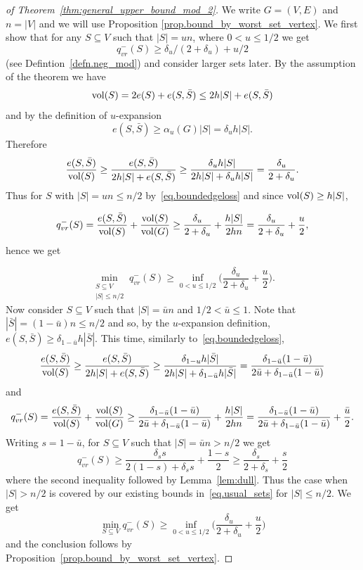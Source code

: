 \documentclass[runningheads, envcountsame, smallextended]{llncs}
\newcommand{\vol}{{\rm vol}}
\numberwithin{theorem}{section}
\numberwithin{definition}{section}
\numberwithin{lemma}{section}
\numberwithin{corollary}{section}
\numberwithin{proposition}{section}
\numberwithin{conjecture}{section}
\numberwithin{remark}{section}
\numberwithin{equation}{section}
\begin{document}
\begin{proof}[of Theorem~\ref{thm:general_upper_bound_mod_2}]
	We write $G=(V,E)$ and $n=|V|$ and we will use Proposition \ref{prop.bound_by_worst_set_vertex}. We first show that for any $S \subseteq V$ such that $|S| =un$, where $0<u\leq 1/2$ we get
	\[
	q_{vr}^-(S) \geq \delta_u/(2+\delta_u)+u/2
	\]
	(see Defintion~\ref{defn.neg_mod}) and consider larger sets later. By the assumption of the theorem we have
	\[
		\vol(S) = 2e(S) + e(S,\bar{S}) \leq 2 h|S| + e(S,\bar{S})
	\]
	and by the definition of $u$-expansion
	\[
		e(S,\bar{S}) \geq \alpha_u(G)|S| = \delta_u h |S|.
	\]
	Therefore
	\begin{equation}\label{eq.boundedgeloss}
		\frac{e(S, \bar{S})}{\vol(S)} \geq \frac{e(S, \bar{S})}{2 h|S| + e(S,\bar{S})} 
		\geq \frac{\delta_u h|S|}{2h|S|+ \delta_u h|S|} = \frac{\delta_u}{2+\delta_u}.
	\end{equation}
    Thus for $S$ with $|S| =  un \leq n/2$ by~\eqref{eq.boundedgeloss} and since $\vol(S)\geq h|S|$,
    
    \[ q_{vr}^{-}(S) = \frac{e(S, \bar{S})}{\vol(S) } + \frac{\vol(S)}{\vol(G)} \geq \frac{\delta_u}{2+\delta_u} + \frac{h|S|}{2hn} =  \frac{\delta_u}{2+\delta_u} + \frac{u}{2}, \]
    hence we get 
   
    \begin{equation}\label{eq.usual_sets}\min_{\substack{S\subseteq V\\|S|\leq n/2}} q_{vr}^{-}(S)\geq \inf_{0 < u \leq 1/2} \Big( \frac{\delta_u}{2+\delta_u}+\frac{u}{2} \Big).
	\end{equation}
	Now consider $S \subseteq V$ such that $|S| = \bar{u}n$ and $1/2<\bar{u}\leq 1$. Note that $|\bar{S}|=(1-\bar{u})n \leq n/2$ and so, by the $u$-expansion definition, $e(S,\bar{S}) \geq \delta_{1-\bar{u}}h|\bar{S}|$. This time, similarly to~\eqref{eq.boundedgeloss},
	\[
		\frac{e(S, \bar{S})}{\vol(S)} 
		\geq \frac{e(S, \bar{S})}{2 h|S| + e(S,\bar{S})}
		\geq \frac{\delta_{1-u} h|\bar{S}|}{2h|S|+ \delta_{1-\bar{u}} h|\bar{S}|} = \frac{\delta_{1-\bar{u}} (1-\bar{u})}{2\bar{u}+\delta_{1-\bar{u}}(1-\bar{u})}
	\]
	and 
	\[ q_{vr}^{-}(S) = \frac{e(S, \bar{S})}{\vol(S) } + \frac{\vol(S)}{\vol(G)} \geq \frac{\delta_{1-\bar{u}}(1-\bar{u})}{2\bar{u}+\delta_{1-\bar{u}}(1-\bar{u})} + \frac{h|S|}{2hn} =  \frac{\delta_{1-\bar{u}}(1-\bar{u})}{2\bar{u}+\delta_{1-\bar{u}}(1-\bar{u})} + \frac{\bar{u}}{2}. \]
	Writing $s=1-\bar{u}$, for $S \subseteq V$ such that $|S|=\bar{u}n > n/2$ we get
	\[ q_{vr}^{-}(S)  \geq \frac{\delta_{s}s}{2(1-s)+\delta_{s}s} + \frac{1-s}{2} \geq \frac{\delta_s}{2+\delta_s}+ \frac{s}{2} \]
	where the second inequality followed by Lemma~\ref{lem:dull}. Thus the case when $|S| > n/2$ is covered by our existing bounds in~\eqref{eq.usual_sets} for $|S|\leq n/2$. We get
	\[
		\min_{S \subseteq V} q_{vr}^{-}(S)\geq \inf_{0 < u \leq 1/2} \Big( \frac{\delta_u}{2+\delta_u}+\frac{u}{2} \Big)
	\]
	and the conclusion follows by Proposition~\ref{prop.bound_by_worst_set_vertex}.
\end{proof}
\end{document}
